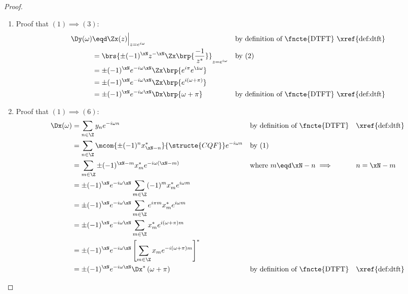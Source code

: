 \begin{proof}
\begin{enumerate}
  \item Proof that $(1)\implies(3)$:
    \begin{align*}
      \Dy(\omega)
        &\eqd \Zx(z)\Big|_{z=e^{i\omega}}
        &&    \text{by definition of \fncte{DTFT} \xref{def:dtft}}
      \\&=    \brs{\pm (-1)^\xN z^{-\xN}\Zx\brp{\frac{-1}{z^\ast}}}_{z=e^{i\omega}}
        &&    \text{by (2)}
      \\&=    \pm (-1)^\xN e^{-i\omega\xN}\Zx\brp{e^{i\pi}e^{\i\omega}}
      \\&=    \pm (-1)^\xN e^{-i\omega\xN}\Zx\brp{e^{i(\omega+\pi)}}
      \\&=    \pm (-1)^\xN e^{-i\omega\xN}\Dx\brp{\omega+\pi}
        &&    \text{by definition of \fncte{DTFT} \xref{def:dtft}}
    \end{align*}

  \item Proof that $(1)\implies(6)$:
    \begin{align*}
      \Dx(\omega) 
        &= \sum_{n\in\Z}  y_{n}  e^{-i\omega n}
        && \text{by definition of \fncte{DTFT}}
        && \text{\xref{def:dtft}}
      \\&= \sum_{n\in\Z} \mcom{\pm (-1)^n x_{\xN-n}^\ast}{\structe{CQF}} e^{-i\omega n}
        && \text{by (1)}
      \\&= \sum_{m\in\Z}\pm (-1)^{\xN-m} x_m^\ast e^{-i\omega (\xN-m)}
        && \text{where $m\eqd\xN-n \implies$}
        && \text{$n=\xN-m$}
      \\&= \pm (-1)^\xN e^{-i\omega\xN}
           \sum_{m\in\Z}(-1)^m x_m^\ast e^{i\omega m}
      \\&= \pm (-1)^\xN e^{-i\omega\xN}
           \sum_{m\in\Z}e^{i\pi m} x_m^\ast e^{i\omega m}
      \\&= \pm (-1)^\xN e^{-i\omega\xN}
           \sum_{m\in\Z}x_m^\ast e^{i (\omega+\pi )m}
      \\&= \pm (-1)^\xN e^{-i\omega\xN}
           \left[ \sum_{m\in\Z}x_m e^{-i(\omega+\pi )m} \right]^\ast
      \\&= \pm (-1)^\xN e^{-i\omega\xN}\Dx^\ast\left(\omega+\pi \right)
        && \text{by definition of \fncte{DTFT}}
        && \text{\xref{def:dtft}}
    \end{align*}


\end{enumerate}
\end{proof}
